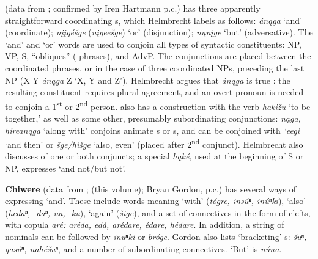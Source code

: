 \documentclass[output=paper]{LSP/langsci}
\begin{document}
\textbf{} (data from \citealt{Helmbrecht2004}; confirmed by Iren Hartmann p.c.) has three apparently straightforward coordinating s, which Helmbrecht labels as follows: \textit{án\k{a}ga} `and' (coordinate); \textit{n\k{i}\k{i}gé\v{s}ge} (\textit{n\k{i}gee\v{s}ge}) `or' (disjunction); \textit{n\k{u}n\k{i}ge} `but' (adversative). The `and' and `or' words are used to conjoin all types of syntactic constituents: NP, VP, S, ``obliques'' ( phrases), and AdvP. The conjunctions are placed between the coordinated phrases, or in the case of three coordinated NPs, preceding the last NP (X Y \textit{án\k{a}ga} Z `X, Y and Z'). Helmbrecht argues that \textit{án\k{a}ga}  is true : the resulting constituent requires plural agreement, and an overt pronoun is needed to conjoin a 1\textsuperscript{st} or 2\textsuperscript{nd} person.  also has a  construction with the verb \textit{haki\v{z}u} `to be together,' as well as some other, presumably subordinating conjunctions: \textit{n\k{a}ga, hirean\k{a}ga} `along with' conjoins animate s or s, and  can be conjoined with \textit{`eegi} `and then' or \textit{\v{s}ge/hi\v{s}ge} `also, even' (placed after 2\textsuperscript{nd} conjunct). Helmbrecht also discusses  of one or both conjuncts; a special  \textit{h\k{a}ké}, used at the beginning of S or NP, expresses `and not/but not'.

\textbf{Chiwere} (data from \citealt{Goodtracks1992}; \citealt{Greer2016} (this volume); Bryan Gordon, p.c.) has several ways of expressing `and'. These include words meaning `with' (\textit{tógre, insúⁿ, inúⁿki}), `also' (\textit{hedaⁿ, -daⁿ, na, -ku}), `again' (\textit{\v{s}ige}), and a set of  connectives in the form of clefts, with copula \textit{aré: aréda, edá, arédare, édare, hédare}. In addition, a string of nominals can be followed by \textit{inuⁿki} or \textit{bróge}. Gordon also lists `bracketing' s: \textit{\v{s}uⁿ, gasúⁿ, nahé\v{s}uⁿ}, and a number of subordinating connectives. `But' is \textit{núna}.

\subsection{}
 
\end{document}
